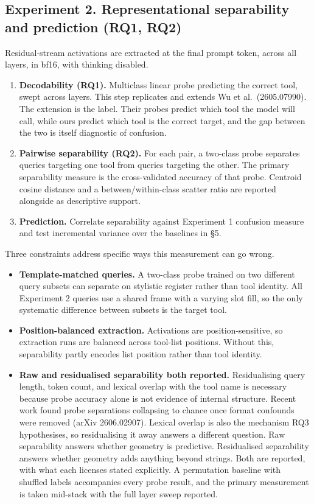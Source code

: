 \documentclass[11pt,a4paper]{article}
\begin{document}
\subsection*{Experiment 2. Representational separability and prediction (RQ1, RQ2)}

Residual-stream activations are extracted at the final prompt token, across all layers, in bf16,
with thinking disabled.

\begin{enumerate}
    \item \textbf{Decodability (RQ1).} Multiclass linear probe predicting the correct tool, swept across layers.
    This step replicates and extends Wu et al.\ (2605.07990). The extension is the label. Their
    probes predict which tool the model will call, while ours predict which tool is the correct
    target, and the gap between the two is itself diagnostic of confusion.
    \item \textbf{Pairwise separability (RQ2).} For each pair, a two-class probe separates queries targeting
    one tool from queries targeting the other. The primary separability measure is the
    cross-validated accuracy of that probe. Centroid cosine distance and a between/within-class
    scatter ratio are reported alongside as descriptive support.
    \item \textbf{Prediction.} Correlate separability against Experiment 1 confusion measure and test
    incremental variance over the baselines in \S5.
\end{enumerate}

Three constraints address specific ways this measurement can go wrong.

\begin{itemize}
    \item \textbf{Template-matched queries.} A two-class probe trained on two different query subsets can
    separate on stylistic register rather than tool identity. All Experiment 2 queries use a shared
    frame with a varying slot fill, so the only systematic difference between subsets is the target
    tool.
    \item \textbf{Position-balanced extraction.} Activations are position-sensitive, so extraction runs are
    balanced across tool-list positions. Without this, separability partly encodes list position
    rather than tool identity.
    \item \textbf{Raw and residualised separability both reported.} Residualising query length, token count,
    and lexical overlap with the tool name is necessary because probe accuracy alone is not
    evidence of internal structure. Recent work found probe separations collapsing to chance once
    format confounds were removed (arXiv 2606.02907). Lexical overlap is also the mechanism RQ3
    hypothesises, so residualising it away answers a different question. Raw separability answers
    whether geometry is predictive. Residualised separability answers whether geometry adds
    anything beyond strings. Both are reported, with what each licenses stated explicitly. A
    permutation baseline with shuffled labels accompanies every probe result, and the primary
    measurement is taken mid-stack with the full layer sweep reported.
\end{itemize}
\end{document}
